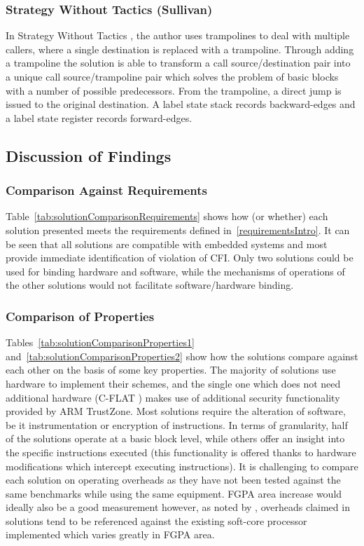 \subsubsection*{Strategy Without Tactics (Sullivan)}
In Strategy Without Tactics \cite{Davi2015}, the author uses trampolines to deal with multiple callers, where a single destination is replaced with a trampoline. Through adding a trampoline the solution is able to transform a call source\slash destination pair into a unique call source\slash trampoline pair which solves the problem of basic blocks with a number of possible predecessors. From the trampoline, a direct jump is issued to the original destination. A label state stack records backward-edges and a label state register records forward-edges. 

\subsection{Discussion of Findings}
\subsubsection*{Comparison Against Requirements}

Table~\ref{tab:solutionComparisonRequirements} shows how (or whether) each solution presented meets the requirements defined in~\ref{requirementsIntro}. It can be seen that all solutions are compatible with embedded systems and most provide immediate identification of violation of CFI. Only two solutions could be used for binding hardware and software, while the mechanisms of operations of the other solutions would not facilitate software\slash hardware binding.

\subsubsection*{Comparison of Properties}


Tables~\ref{tab:solutionComparisonProperties1} and~\ref{tab:solutionComparisonProperties2} show how the solutions compare against each other on the basis of some key properties. The majority of solutions use hardware to implement their schemes, and the single one which does not need additional hardware (C-FLAT \cite{Abera2016}) makes use of additional security functionality provided by ARM TrustZone. Most solutions require the alteration of software, be it instrumentation or encryption of instructions. In terms of granularity, half of the solutions operate at a basic block level, while others offer an insight into the specific instructions executed (this functionality is offered thanks to hardware modifications which intercept executing instructions). It is challenging to compare each solution on operating overheads as they have not been tested against the same benchmarks while using the same equipment. FGPA area increase would ideally also be a good measurement however, as noted by \cite{DeClercq2017}, overheads claimed in solutions tend to be referenced against the existing soft-core processor implemented which varies greatly in FGPA area.



